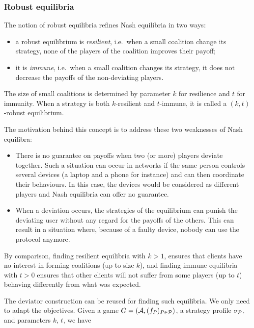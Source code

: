 \subsubsection{Robust equilibria}
\label{13-subsec:robust-equilibria}
The notion of robust equilibria refines Nash equilibria in two ways:

\begin{itemize}
\item   a robust equilibrium is \emph{resilient}, i.e.~when a small coalition
  change its strategy, none of the players of the coalition improves their
  payoff;
\item   it is \emph{immune}, i.e.~when a small coalition changes its strategy,
  it does not decrease the payoffs of the non-deviating players.
\end{itemize}

The size of small coalitions is determined by parameter \(k\) for
resilience and \(t\) for immunity. When a strategy is both
\(k\)-resilient and \(t\)-immune, it is called a \((k,t)\)-robust
equilibrium.

The motivation behind this concept is to address these two weaknesses of
Nash equilibra:

\begin{itemize}
\item   There is no guarantee on payoffs when two (or more) players deviate together.
  Such a situation can occur in networks if the same person controls several devices
  (a laptop and a phone for instance) and can then coordinate their
  behaviours. In this case, the devices would be considered as different
  players and Nash equilibria can offer no guarantee.
\item   When a deviation occurs, the strategies of the equilibrium can punish
  the deviating user without any regard for the payoffs of the others. This
  can result in a situation where, because of a faulty device, nobody
  can use the protocol anymore.
\end{itemize}

By comparison, finding resilient equilibria with \(k>1\), 
ensures that clients have no interest in forming coalitions (up
to size \(k\)), and finding immune equilibria with \(t>0\)
ensures that other clients will not suffer from some players (up to
\(t\)) behaving differently from what was expected.

The deviator construction can be reused for finding such equilibria. We
only need to adapt the objectives. Given a game \(G=(\mathcal{A}, (f_P)_{P \in \mathcal{P}})\), a
strategy profile \(\sigma_{\mathcal{P}}\), and parameters \(k\), \(t\), we have

